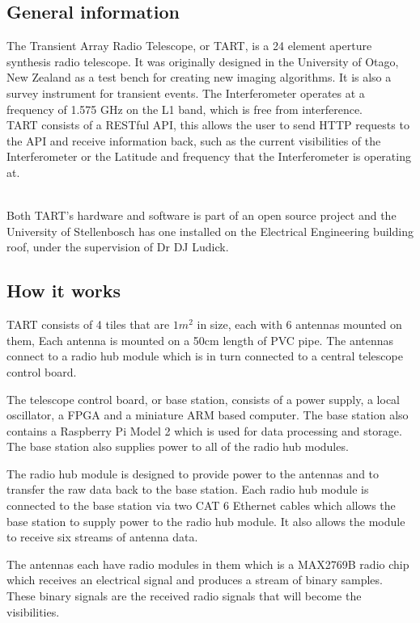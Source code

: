 \subsection{General information}
The Transient Array Radio Telescope, or TART, is a 24 element aperture synthesis radio telescope. It was originally designed in the University of Otago, New Zealand as a test bench for creating new imaging algorithms. It is also a survey instrument for transient events.\cite{DESIGN_TART} The Interferometer operates at a frequency of 1.575 GHz on the L1 band, which is free from interference.
\\
TART consists of a RESTful API, this allows the user to send HTTP requests to the API and receive information back, such as the current visibilities of the Interferometer or the Latitude and frequency that the Interferometer is operating at.\cite{CALIBRATION_TART}

\\ Both TART's hardware and software is part of an open source project and the University of Stellenbosch has one installed on the Electrical Engineering building roof, under the supervision of Dr DJ Ludick.

\subsection{How it works}
TART consists of 4 tiles that are $1m^2$ in size, each with 6 antennas mounted on them, Each antenna is mounted on a 50cm length of PVC pipe. The antennas connect to a radio hub module which is in turn connected to a central telescope control board.\cite{LAYOUT_TART}

The telescope control board, or base station, consists of a power supply, a local oscillator, a FPGA and a miniature ARM based computer. The base station also contains a Raspberry Pi Model 2 which is used for data processing and storage. The base station also supplies power to all of the radio hub modules.\cite{CALIBRATION_AND_SYNTHESIS_TART}

The radio hub module is designed to provide power to the antennas and to transfer the raw data back to the base station. Each radio hub module is connected to the base station via two CAT 6 Ethernet cables which allows the base station to supply power to the radio hub module. It also  allows the module to receive six streams of antenna data.\cite{CALIBRATION_AND_SYNTHESIS_TART}

The antennas each have radio modules in them which is a MAX2769B radio chip\cite{RADIO_CHIP} which receives an electrical signal and produces a stream of binary samples.\cite{CALIBRATION_AND_SYNTHESIS_TART} These binary signals are the received radio signals that will become the visibilities.

